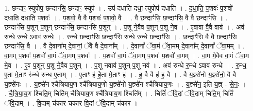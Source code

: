 \documentclass[17pt]{extarticle}
\begin{document}
1. छन्दाꣳ॒॒ स्युपोप॒ छन्दाꣳ॑सि॒ छन्दाꣳ॒॒ स्युप॑ । . उप॑ दधाति दधा॒ त्युपोप॑ दधाति । . द॒धा॒ति॒ प॒शवः॑ प॒शवो॑ दधाति दधाति प॒शवः॑ । . प॒शवो॒ वै वै प॒शवः॑ प॒शवो॒ वै । . वै छन्दाꣳ॑सि॒ छन्दाꣳ॑सि॒ वै वै छन्दाꣳ॑सि । . छन्दाꣳ॑सि प॒शून् प॒शून् छन्दाꣳ॑सि॒ छन्दाꣳ॑सि प॒शून् । . प॒शू ने॒वैव प॒शून् प॒शू ने॒व । . ए॒वावा वै॒वै वाव॑ । . अव॑ रुन्धे रु॒न्धे ऽवाव॑ रुन्धे । . रु॒न्धे॒ छन्दाꣳ॑सि॒ छन्दाꣳ॑सि रुन्धे रुन्धे॒ छन्दाꣳ॑सि । . छन्दाꣳ॑सि॒ वै वै छन्दाꣳ॑सि॒ छन्दाꣳ॑सि॒ वै । . वै दे॒वाना᳚म् दे॒वानां॒ ॅवै वै दे॒वाना᳚म् । . दे॒वानां᳚ ॅवा॒मं ॅवा॒मम् दे॒वाना᳚म् दे॒वानां᳚ ॅवा॒मम् । . वा॒मम् प॒शवः॑ प॒शवो॑ वा॒मं ॅवा॒मम् प॒शवः॑ । . प॒शवो॑ वा॒मं ॅवा॒मम् प॒शवः॑ प॒शवो॑ वा॒मम् । . वा॒म मे॒वैव वा॒मं ॅवा॒म मे॒व । . ए॒व प॒शून् प॒शू ने॒वैव प॒शून् । . प॒शू नवाव॑ प॒शून् प॒शू नव॑ । . अव॑ रुन्धे रु॒न्धे ऽवाव॑ रुन्धे । . रु॒न्ध॒ ए॒ता मे॒ताꣳ रु॑न्धे रुन्ध ए॒ताम् । . ए॒ताꣳ ह॑ है॒ता मे॒ताꣳ ह॑ । . ह॒ वै वै ह॑ ह॒ वै । . वै य॒ज्ञ्से॑नो य॒ज्ञ्से॑नो॒ वै वै य॒ज्ञ्से॑नः । . य॒ज्ञ्से॑न श्चैत्रियाय॒ण श्चै᳚त्रियाय॒णो य॒ज्ञ्से॑नो य॒ज्ञ्से॑न श्चैत्रियाय॒णः । . य॒ज्ञ्से॑न॒ इति॑ य॒ज्ञ् - से॒नः॒ । . चै॒त्रि॒या॒य॒ण श्चिति॒म् चिति॑म् चैत्रियाय॒ण श्चै᳚त्रियाय॒ण श्चिति᳚म् । . चितिं॑ ॅवि॒दां ॅवि॒दाम् चिति॒म् चितिं॑ ॅवि॒दाम् । . वि॒दाम् च॑कार चकार वि॒दां ॅवि॒दाम् च॑कार । \newline
\end{document}
